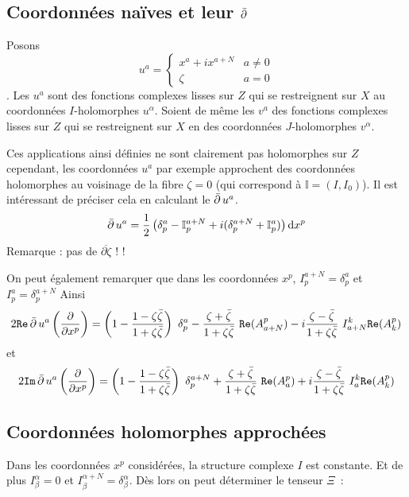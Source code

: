 \documentclass[12pt,draft]{article}
\renewcommand{\Re}{\texttt{Re}}
\renewcommand{\Im}{\texttt{Im}}
\begin{document}
\subsection{Coordonnées naïves et leur $\operatorname{\bar{\partial}}$}
Posons \[
u^a = \left\lbrace
\begin{array}{cc}
x^a + ix^{a+N} & a \neq 0 \\
\zeta & a = 0
\end{array}
\right.
\]. Les $u^a$ sont des fonctions complexes lisses sur $Z$ qui se restreignent sur $X$ au coordonnées $I$-holomorphes $u^\alpha$.
Soient de même les $v^a$ des fonctions complexes lisses sur $Z$ qui se restreignent sur $X$ en des coordonnées $J$-holomorphes $v^\alpha$.

Ces applications ainsi définies ne sont clairement pas holomorphes sur $Z$ cependant, les coordonnées $u^a$ par exemple approchent des coordonnées holomorphes au voisinage de la fibre $\zeta = 0$ (qui correspond à $\mathbb{I} = (I,I_0)$). Il est intéressant de préciser cela en calculant le $\operatorname{\bar{\partial}} u^a$.
\[
\operatorname{\bar{\partial}} u^a = \operatorname{\frac{1}{2}} \left( \delta^a_p - \mathbb{I}^{a+N}_p + i(\delta^{a+N}_p + \mathbb{I}^a_p) \right) \operatorname{d\!} x^p
\]
Remarque  : pas de $\overline{\partial \zeta}$ ! ! 

On peut également remarquer que dans les coordonnées $x^p$, $I^{a+N}_p = \delta^a_p$ et $I^a_p = \delta^{a+N}_p$
Ainsi
\[
2  \Re \dbarre u^a \left(\dpp{}{x^p}\right) = \left(1 - \dfrac{1-\zeta \bar{\zeta}}{1+\zeta \bar{\zeta}}\right) \ \delta^a_p - \dfrac{\zeta + \bar{\zeta}}{1+\zeta \bar{\zeta}}\ \Re(A_{a+N}^p) - i\dfrac{\zeta - \bar{\zeta}}{1+\zeta \bar{\zeta}}\ I_{a+N}^k\Re(A_k^p) 
\]
et
\[
2  \Im \dbarre u^a \left(\dpp{}{x^p}\right) =
\left(1 - \dfrac{1-\zeta \bar{\zeta}}{1+\zeta \bar{\zeta}}\right) \ \delta^{a+N}_p + \dfrac{\zeta + \bar{\zeta}}{1+\zeta \bar{\zeta}}\ \Re(A_a^p) + i\dfrac{\zeta - \bar{\zeta}}{1+\zeta \bar{\zeta}}\ I_{a}^k\Re(A_k^p)
\]  

\subsection{Coordonnées holomorphes approchées}
Dans les coordonnées $x^p$ considérées, la structure complexe $I$ est constante. Et de plus $I^\alpha_\beta = 0$ et $I^{\alpha+N}_\beta = \delta^\alpha_\beta$.
Dès lors on peut déterminer le tenseur $\Xi$~:\iffalse
\[
\Xi^a_b = \mathbb{I}^{a+N}_b + i \mathbb{I}^a_b = \dfrac{1}{1+|\zeta|^2}\left( (1-|\zeta|^2)\delta^a_b + 2\Re(\zeta A^{a+N}_b) + 2i\Re(\zeta A^a_b) \right)
\]
 et ses dérivées~:
\[
\dpp{\Xi^a_b}{u^c} =\dfrac{2}{1+|\zeta|^2}\left( \Re(\zeta) \dpp{\Re(A^{a+N}_b)}{u^c} - \Im(\zeta)\dpp{\Im(A^{a+N}_b)}{u^c} + i\Re(\zeta)\dpp{\Re(A^a_b)}{u^c} - i\Im(\zeta)\dpp{\Im(A^{a}_b)}{u^c} \right)
\]
pour $c<N$ (car $u^N = \zeta$).
\fi
\appendix
\end{document}
